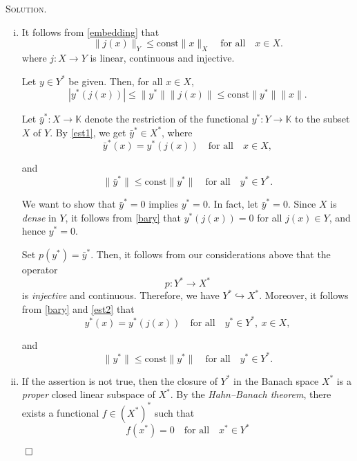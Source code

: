 \documentclass[12pt, a4paper, oneside]{ctexart}
\newenvironment{solution}{%
	\par\noindent\textsc{Solution. }\ignorespaces
}{%
	\hfill$\qed$\par
}
\begin{document}
	\begin{solution}
		\begin{enumerate}[(i)]
			\item 
			It follows from \eqref{embedding} that  
			\[
			\|j(x)\|_Y \leq \text{const} \|x\|_X \quad \text{for all} \quad x \in X.
			\]
			where $j: X\to Y$ is linear, continuous and injective.
			
			Let \( y \in Y^* \) be given. Then, for all \( x \in X \),  
			\begin{equation}
				| y^*(j(x))| \leq \|y^*\| \|j(x)\| \leq \text{const} \|y^*\| \|x\|. \label{est1}
			\end{equation}
			
			
			Let \( \bar{y}^*: X \to \mathbb{K} \) denote the restriction of the functional \( y^*: Y \to \mathbb{K} \) to the subset \( X \) of \( Y \). By \eqref{est1}, we get \( \bar{y}^* \in X^* \), where  
			\begin{equation}
				\bar{y}^*(x)  =  y^*(j(x)) \quad \text{for all} \quad x \in X, \label{bary}
			\end{equation}
		
			and  
			\begin{equation}
				\|\bar{y}^*\| \leq \text{const} \|y^*\| \quad \text{for all} \quad y^* \in Y^*. \label{est2}
			\end{equation}
			
			
			We want to show that \( \bar{y}^* = 0 \) implies \( y^* = 0 \). In fact, let \( \bar{y}^* = 0 \). Since \( X \) is \textit{dense} in \( Y \), it follows from \eqref{bary} that \(  y^*(j(x)) = 0 \) for all \( j(x) \in Y \), and hence \( y^* = 0 \).
			
			Set \( p(y^*) = \bar{y}^* \). Then, it follows from our considerations above that the operator  
			\[
			p: Y^* \to X^*
			\]
			is \textit{injective} and continuous. Therefore, we have \( Y^* \hookrightarrow X^* \). Moreover, it follows from \eqref{bary} and \eqref{est2} that  
			\begin{equation}
				 y^*(x)= y^*(j(x)) \quad \text{for all} \quad y^* \in Y^*, \ x \in X, \label{equ1}	
			\end{equation}
			
			
			and  
			\[
			\|y^*\| \leq \text{const} \|y^*\| \quad \text{for all} \quad y^* \in Y^*.
			\]
			
			\item  If the assertion is not true, then the closure of \( Y^* \) in the Banach space \( X^* \) is a \textit{proper} closed linear subspace of \( X^* \). By the \textit{Hahn–Banach theorem}, there exists a functional \( f \in (X^*)^* \) such that  
			\begin{equation}
				f(x^*) = 0 \quad \text{for all} \quad x^* \in Y^* \label{equ2}
			\end{equation}
			

\end{enumerate}
\end{solution}
\end{document}
